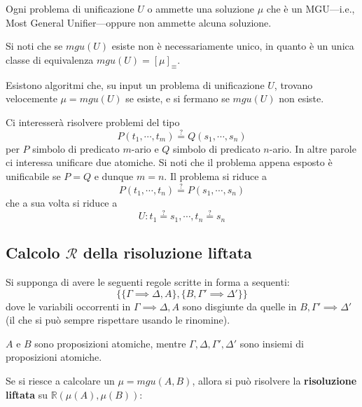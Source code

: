 \begin{teo}[di Unificazione]
Ogni problema di unificazione $U$ o ammette una soluzione $\mu$ che è un MGU—i.e., Most General Unifier—oppure non ammette alcuna soluzione.
\end{teo}
Si noti che se $mgu(U)$ esiste non è necessariamente unico, in quanto è un unica classe di equivalenza $mgu(U) = [\mu]_{\equiv}$.

Esistono algoritmi che, su input un problema di unificazione $U$, trovano velocemente $\mu = mgu(U)$ se esiste, e si fermano se $mgu(U)$ non esiste.

Ci interesserà risolvere problemi del tipo 
$$
P(t_1, \cdots, t_m) \stackrel{?}{=} Q(s_1, \cdots, s_n)
$$
per $P$ simbolo di predicato $m$-ario e $Q$ simbolo di predicato $n$-ario. In 
altre parole ci interessa unificare due atomiche. Si noti che il problema appena 
esposto è unificabile se $P = Q$ e dunque $m = n$. Il problema si riduce a 
$$
P(t_1, \cdots, t_n) \stackrel{?}{=} P(s_1, \cdots, s_n)
$$
che a sua volta si riduce a 
$$
U: t_1 \stackrel{?}{=}s_1, \cdots, t_n \stackrel{?}{=}s_n
$$

\subsection{Calcolo $\mathscr{R}$ della risoluzione liftata}
Si supponga di avere le seguenti regole scritte in forma 
a sequenti: 
$$
\{\{\Gamma \implies \Delta, A\}, \{B, \Gamma' \implies \Delta'\}\}
$$
dove le variabili occorrenti in $\Gamma \implies \Delta, A$ sono disgiunte da quelle in $B, \Gamma' \implies \Delta'$ (il che si può sempre rispettare usando le rinomine). 

$A$ e $B$ sono proposizioni atomiche, mentre $\Gamma, \Delta, \Gamma', \Delta'$ sono insiemi di proposizioni atomiche.

Se si riesce a calcolare un $\mu = mgu(A,B)$, allora si può risolvere la \textbf{risoluzione liftata} su $\mathbb{R}(\mu(A), \mu(B))$: 
\begin{prooftree}
\end{prooftree}

